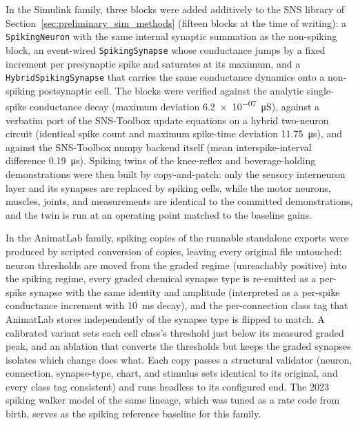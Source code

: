 In the Simulink family, three blocks were added additively to the SNS library of Section~\ref{sec:preliminary_sim_methods} (fifteen blocks at the time of writing): a \texttt{SpikingNeuron} with the same internal synaptic summation as the non-spiking block, an event-wired \texttt{SpikingSynapse} whose conductance jumps by a fixed increment per presynaptic spike and saturates at its maximum, and a \texttt{HybridSpikingSynapse} that carries the same conductance dynamics onto a non-spiking postsynaptic cell. The blocks were verified against the analytic single-spike conductance decay (maximum deviation \qty{6.2e-07}{\micro\siemens}), against a verbatim port of the SNS-Toolbox update equations on a hybrid two-neuron circuit (identical spike count and maximum spike-time deviation \qty{11.75}{\micro\second}), and against the SNS-Toolbox numpy backend itself (mean interspike-interval difference \qty{0.19}{\micro\second}). Spiking twins of the knee-reflex and beverage-holding demonstrations were then built by copy-and-patch: only the sensory interneuron layer and its synapses are replaced by spiking cells, while the motor neurons, muscles, joints, and measurements are identical to the committed demonstrations, and the twin is run at an operating point matched to the baseline gains.

In the AnimatLab family, spiking copies of the runnable standalone exports were produced by scripted conversion of copies, leaving every original file untouched: neuron thresholds are moved from the graded regime (unreachably positive) into the spiking regime, every graded chemical synapse type is re-emitted as a per-spike synapse with the same identity and amplitude (interpreted as a per-spike conductance increment with \qty{10}{\ms} decay), and the per-connection class tag that AnimatLab stores independently of the synapse type is flipped to match. A calibrated variant sets each cell class's threshold just below its measured graded peak, and an ablation that converts the thresholds but keeps the graded synapses isolates which change does what. Each copy passes a structural validator (neuron, connection, synapse-type, chart, and stimulus sets identical to its original, and every class tag consistent) and runs headless to its configured end. The 2023 spiking walker model of the same lineage, which was tuned as a rate code from birth, serves as the spiking reference baseline for this family.

